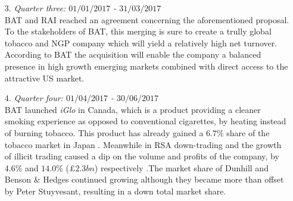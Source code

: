 \documentclass[letterpaper, 10 pt, conference]{ieeeconf}  %
\begin{document}
\begin{enumerate}
 		BAT proposed a merge with Reynolds American Inc.\footnote{Reynolds American Inc. is in the top 5 best performing companies in the dowJones stock exchange.} (RAI) through the acquisition of the remaining $57.8 \% $ it did not already own. It valued RAI at $\$ 56.60$ per share of which $\$ 24.13$ would be in cash and $\$ 32.37$ would be in BAT shares \cite{Proposes_Merger}. This meant top RAI executives were offered seats in BAT's board of directors. The merging of these companies meant combined R $\&$ D capabilities to deliver a class pipeline of vapour and tobacco heating products across markets globally. This would then give BAT a competitive advantage since Next Generation Products(NGPs) would result and thus eventually making BAT to be the largest listed tobacco company by operating profit and net turn over. This proposal stimulated investments. Despite these encouraging news of physcal growth, BAT's share price in the JSE continued to drop(see Appendix \ref{sec:QuarterlyAnalysis}) until the beginning of December 2016 because of the aforementioned alleged bribery allegations  . From this month, BAT recovered the losses. This shows stability within the company because despite of bad publicity, the BAT's board remained intact and they launched an internal investigation regarding the bribery issue.
 		
 		\item[3.]\textit{Quarter three: $01/01/2017$ - $31/03/2017$}
 		\\
 		BAT and RAI reached an agreement concerning the aforementioned proposal. To the stakeholders of BAT, this merging is sure to create a trully global tobacco and NGP company which will yield a relatively high net turnover. According to BAT the acquisition will enable the company a balanced presence in high growth emerging markets combined with direct access to the attractive US market. 
 		
 		\item[4.]\textit{Quarter four: $01/04/2017$ - $30/06/2017$}
 		\\
 		BAT launched \textit{iGlo} in Canada, which is a product providing a cleaner smoking experience as opposed to conventional cigarettes, by heating instead of burning tobacco. This product has already gained a $6.7\%$ share of the tobacco market in Japan \cite{BAT_nextgen}. Meanwhile in RSA down-trading and the growth of illicit trading caused a dip on the volume and profits of the company, by $4.6\%$ and $14.0\%$ ($\pounds2.3bn$) respectively \cite{Board_Appointment} \cite{BusinessLives}.The market share of Dunhill and Benson \& Hedges continued growing although they became more than offset by Peter Stuyvesant, resulting in a down total market share\cite{Board_Appointment}.

 		

 	\end{enumerate}	
\end{document}
